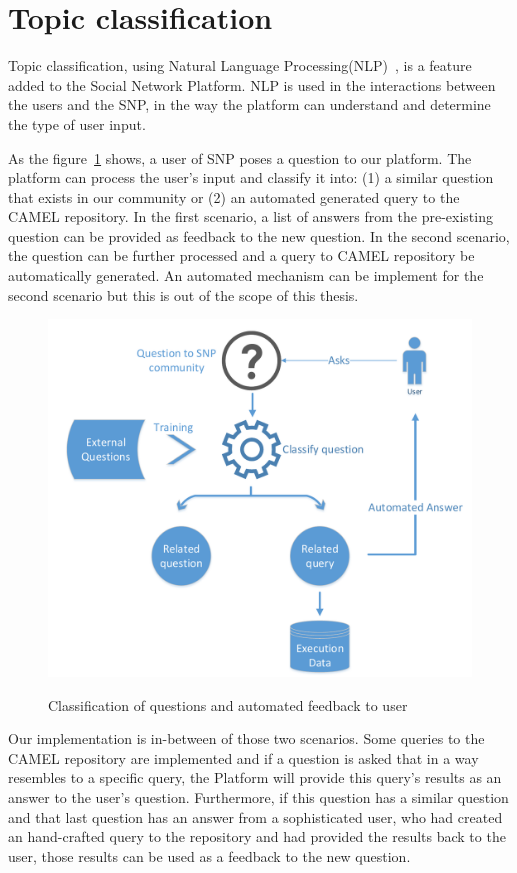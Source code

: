 \section{Topic classification}
\label{sec:natural_implementation}
Topic classification, using Natural Language Processing(NLP)~\cite{manning1999foundations}, is a feature added to the Social Network Platform. NLP is used in the interactions between the users and the SNP, in the way the platform can understand and determine the type of user input. 

As the figure~\ref{fig:auto_classification} shows, a user of SNP poses a question to our platform. The platform can process the user's input and classify it into: (1) a similar question that exists in our community or (2) an automated generated query to the CAMEL repository. In the first scenario, a list of answers from the pre-existing question can be provided as feedback to the new question. In the second scenario, the question can be further processed and a query to CAMEL repository be automatically generated. An automated mechanism can be implement for the second scenario but this is out of the scope of this thesis.  

\begin{figure}[h]
	\caption{Classification of questions and automated feedback to user}
	\includegraphics[width=1\textwidth]{./fig/Decision_making.pdf}
	\centering
	\label{fig:auto_classification}
\end{figure}

Our implementation is in-between of those two scenarios. Some queries to the CAMEL repository are implemented and if a question is asked that in a way resembles to a specific query, the Platform will provide this query's results as an answer to the user's question. Furthermore, if this question has a similar question and that last question has an answer from a sophisticated user, who had created an hand-crafted query to the repository and had provided the results back to the user, those results can be used as a feedback to the new question. 

